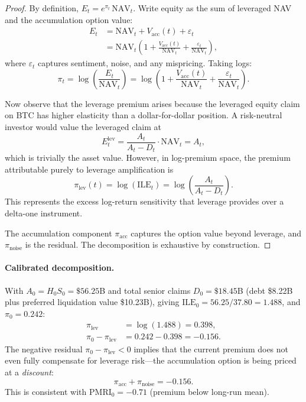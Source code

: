 \begin{proof}
By definition, $E_t = e^{\pi_t}\,\mathrm{NAV}_t$.  Write equity as
the sum of leveraged NAV and the accumulation option value:
\begin{align*}
  E_t
  &= \mathrm{NAV}_t + V_{\mathrm{acc}}(t) + \varepsilon_t \\
  &= \mathrm{NAV}_t \left(1 + \frac{V_{\mathrm{acc}}(t)}{\mathrm{NAV}_t}
     + \frac{\varepsilon_t}{\mathrm{NAV}_t}\right),
\end{align*}
where $\varepsilon_t$ captures sentiment, noise, and any mispricing.
Taking logs:
$$
  \pi_t = \log\!\left(\frac{E_t}{\mathrm{NAV}_t}\right)
  = \log\!\left(1 + \frac{V_{\mathrm{acc}}(t)}{\mathrm{NAV}_t}
    + \frac{\varepsilon_t}{\mathrm{NAV}_t}\right).
$$

Now observe that the leverage premium arises because the leveraged
equity claim on BTC has higher elasticity than a dollar-for-dollar
position.  A risk-neutral investor would value the leveraged claim at
$$
  E_t^{\mathrm{lev}} = \frac{A_t}{A_t - D_t} \cdot \mathrm{NAV}_t
  = A_t,
$$
which is trivially the asset value.  However, in log-premium space,
the premium attributable purely to leverage amplification is
$$
  \pi_{\mathrm{lev}}(t) = \log(\mathrm{ILE}_t)
  = \log\!\left(\frac{A_t}{A_t - D_t}\right).
$$
This represents the excess log-return sensitivity that leverage provides
over a delta-one instrument.

The accumulation component $\pi_{\mathrm{acc}}$ captures the option
value beyond leverage, and $\pi_{\mathrm{noise}}$ is the residual.
The decomposition is exhaustive by construction.
\end{proof}

\paragraph{Calibrated decomposition.}
With $A_0 = H_0 S_0 = \$56.25$B and total senior claims
$D_0 = \$18.45$B (debt \$8.22B plus preferred liquidation value \$10.23B),
giving $\mathrm{ILE}_0 = 56.25/37.80 = 1.488$, and $\pi_0 = 0.242$:
\begin{align*}
  \pi_{\mathrm{lev}}
  &= \log(1.488) = 0.398, \\
  \pi_0 - \pi_{\mathrm{lev}}
  &= 0.242 - 0.398 = -0.156.
\end{align*}
The negative residual $\pi_0 - \pi_{\mathrm{lev}} < 0$ implies that the
current premium does not even fully compensate for leverage risk---the
accumulation option is being priced at a \emph{discount}:
$$
  \pi_{\mathrm{acc}} + \pi_{\mathrm{noise}} = -0.156.
$$
This is consistent with $\mathrm{PMRI}_0 = -0.71$ (premium below
long-run mean).

